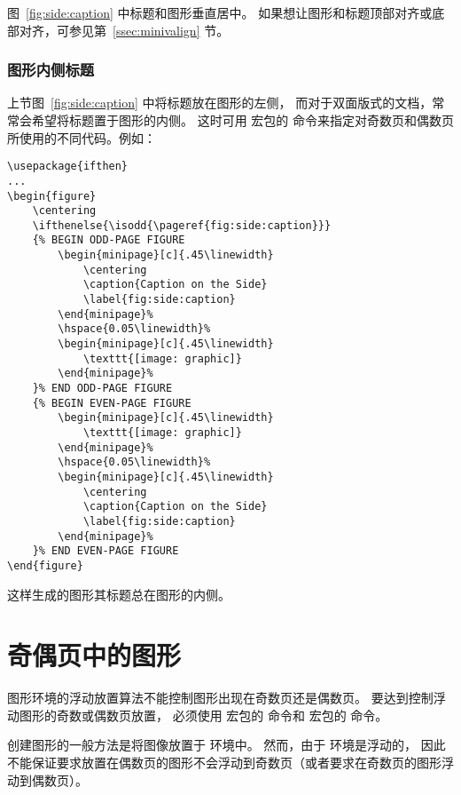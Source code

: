 图~\ref{fig:side:caption} 中标题和图形垂直居中。
如果想让图形和标题顶部对齐或底部对齐，可参见第~\ref{ssec:minivalign} 节。

\subsubsection{图形内侧标题}\label{sssec:bindcaption}

上节图~\ref{fig:side:caption} 中将标题放在图形的左侧，
而对于双面版式的文档，常常会希望将标题置于图形的内侧。
这时可用  宏包的  命令来指定对奇数页和偶数页所使用的不同代码。例如：
\begin{lstlisting}
\usepackage{ifthen}
...
\begin{figure}
	\centering
	\ifthenelse{\isodd{\pageref{fig:side:caption}}}
	{% BEGIN ODD-PAGE FIGURE
		\begin{minipage}[c]{.45\linewidth}
			\centering
			\caption{Caption on the Side}
			\label{fig:side:caption}
		\end{minipage}%
		\hspace{0.05\linewidth}%
		\begin{minipage}[c]{.45\linewidth}
			\texttt{[image: graphic]}
		\end{minipage}%
	}% END ODD-PAGE FIGURE
	{% BEGIN EVEN-PAGE FIGURE
		\begin{minipage}[c]{.45\linewidth}
			\texttt{[image: graphic]}
		\end{minipage}%
		\hspace{0.05\linewidth}%
		\begin{minipage}[c]{.45\linewidth}
			\centering
			\caption{Caption on the Side}
			\label{fig:side:caption}
		\end{minipage}%
	}% END EVEN-PAGE FIGURE
\end{figure}
\end{lstlisting}
这样生成的图形其标题总在图形的内侧。


\section{奇偶页中的图形}\label{sec:evenoddpage}

图形环境的浮动放置算法不能控制图形出现在奇数页还是偶数页。
要达到控制浮动图形的奇数或偶数页放置，
必须使用  宏包的  命令和  宏包的  命令。

创建图形的一般方法是将图像放置于  环境中。
然而，由于  环境是浮动的，
因此不能保证要求放置在偶数页的图形不会浮动到奇数页（或者要求在奇数页的图形浮动到偶数页）。

